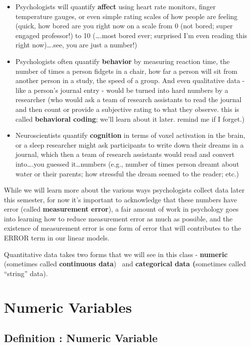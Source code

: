 \documentclass[
  letterpaper,
  DIV=11,
  numbers=noendperiod,
  oneside]{scrreprt}
\begin{document}
\begin{itemize}
\item
  Psychologists will quantify \textbf{affect} using heart rate monitors,
  finger temperature gauges, or even simple rating scales of how people
  are feeling (quick, how bored are you right now on a scale from 0 (not
  bored; super engaged professor!) to 10 (\ldots.most bored ever;
  surprised I'm even reading this right now)\ldots.see, you are just a
  number!)
\item
  Psychologists often quantify \textbf{behavior} by measuring reaction
  time, the number of times a person fidgets in a chair, how far a
  person will sit from another person in a study, the speed of a group.
  And even qualitative data - like a person's journal entry - would be
  turned into hard numbers by a researcher (who would ask a team of
  research assistants to read the journal and then count or provide a
  subjective rating to what they observe. this is called
  \textbf{behavioral coding}; we'll learn about it later. remind me if I
  forget.)
\item
  Neuroscientists quantify \textbf{cognition} in terms of voxel
  activation in the brain, or a sleep researcher might ask participants
  to write down their dreams in a journal, which then a team of research
  assistants would read and convert into\ldots.you guessed
  it\ldots numbers (e.g., number of times person dreamt about water or
  their parents; how stressful the dream seemed to the reader; etc.)
\end{itemize}

While we will learn more about the various ways psychologists collect
data later this semester, for now it's important to acknowledge that
these numbers have error (called \textbf{measurement error}), a fair
amount of work in psychology goes into learning how to reduce
measurement error as much as possible, and the existence of measurement
error is one form of error that will contributes to the ERROR term in
our linear models.

Quantitative data takes two forms that we will see in this class -
\textbf{numeric} (sometimes called \textbf{continuous data})~ and
\textbf{categorical data (}sometimes called ``string'' data).~

\section{Numeric Variables}\label{numeric-variables}

\subsection{Definition : Numeric
Variable}\label{definition-numeric-variable}
\end{document}
